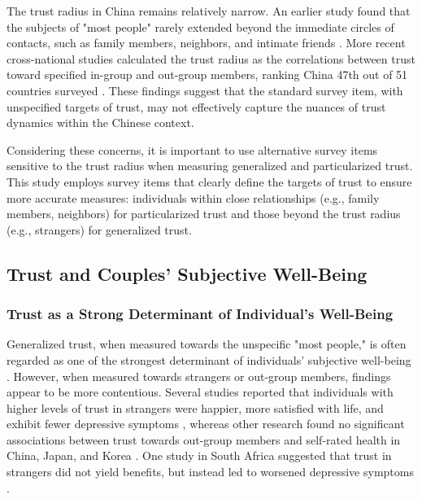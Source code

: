 The trust radius in China remains relatively narrow. An earlier study found that the subjects of "most people" rarely extended beyond the immediate circles of contacts, such as family members, neighbors, and intimate friends \parencite{liParticularizedTrustGeneralized2002}. More recent cross-national studies calculated the trust radius as the correlations between trust toward specified in-group and out-group members, ranking China 47th out of 51 countries surveyed \parencite{delheyHowGeneralTrust2011}. These findings suggest that the standard survey item, with unspecified targets of trust, may not effectively capture the nuances of trust dynamics within the Chinese context.

Considering these concerns, it is important to use alternative survey items sensitive to the trust radius when measuring generalized and particularized trust. This study employs survey items that clearly define the targets of trust to ensure more accurate measures: individuals within close relationships (e.g., family members, neighbors) for particularized trust and those beyond the trust radius (e.g., strangers) for generalized trust.

\subsection{Trust and Couples' Subjective Well-Being}

\subsubsection{Trust as a Strong Determinant of Individual's Well-Being}

Generalized trust, when measured towards the unspecific "most people," is often regarded as one of the strongest determinant of individuals' subjective well-being \parencite{adedejiExaminingPathwaysGeneral2023,helliwellHowsLifeCombining2003}. However, when measured towards strangers or out-group members, findings appear to be more contentious. Several studies reported that individuals with higher levels of trust in strangers were happier, more satisfied with life, and exhibit fewer depressive symptoms \parencite{churchillTrustSocialNetworks2017,baiSocialTrustPattern2019}, whereas other research found no significant associations between trust towards out-group members and self-rated health in China, Japan, and Korea \parencite{sungTrustHealthCrossnational2019,sungIngroupTrustSelfrated2020}. One study in South Africa suggested that trust in strangers did not yield benefits, but instead led to worsened depressive symptoms \parencite{adjaye-gbewonyoHighSocialTrust2018}.

